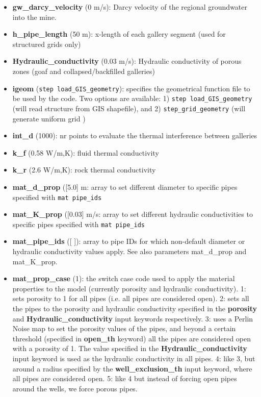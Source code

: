 \begin{itemize}
\item {\bf gw\_darcy\_velocity} (0 m/s): Darcy velocity of the regional groundwater into the mine.   
\item {\bf h\_pipe\_length} (50 m): x-length of each gallery segment (used for structured grids only) 
\item {\bf Hydraulic\_conductivity} (0.03 m/s): Hydraulic conductivity of porous zones (goaf and collapsed/backfilled galleries) 
\item {\bf igeom} (\verb|step load_GIS_geometry|): specifies the geometrical function file to be used by the code. Two options are available: 1) \verb|step load_GIS_geometry| (will read structure from GIS shapefile), and 2) \verb|step_grid_geometry| (will generate uniform grid ) 
\item {\bf int\_d} (1000): nr points to evaluate the thermal interference between galleries 
\item {\bf k\_f} (0.58 W/m,K): fluid thermal conductivity 
\item {\bf k\_r} (2.6 W/m,K): rock thermal conductivity 
\item {\bf mat\_d\_prop} ([5.0] m: array to set different diameter to specific pipes specified with \verb|mat pipe_ids|
\item {\bf mat\_K\_prop} ([0.03] m/s: array to set different hydraulic conductivities to specific pipes specified with \verb|mat pipe_ids|
\item {\bf mat\_pipe\_ids} ([ ]): array to pipe IDs for which non-default diameter or hydraulic conductivity values apply. See also parameters mat\_d\_prop and mat\_K\_prop.
\item {\bf mat\_prop\_case} (1): the switch case code used to apply the material properties to the model (currently porosity and hydraulic conductivity). 1: sets porosity to 1 for all pipes (i.e. all pipes are considered open). 2: sets all the pipes to the porosity and hydraulic conductivity specified in the \textbf{porosity} and \textbf{Hydraulic\_conductivity} input keywords respectively. 3: uses a Perlin Noise map to set the porosity values of the pipes, and beyond a certain threshold (specified in \textbf{open\_th} keyword) all the pipes are considered open with a porosity of 1. The value specified in the \textbf{Hydraulic\_conductivity} input keyword is used as the hydraulic conductivity in all pipes. 4: like 3, but around a radius specified by the \textbf{well\_exclusion\_th} input keyword, where all pipes are considered open. 5: like 4 but instead of forcing open pipes around the wells, we force porous pipes. 

\end{itemize}
